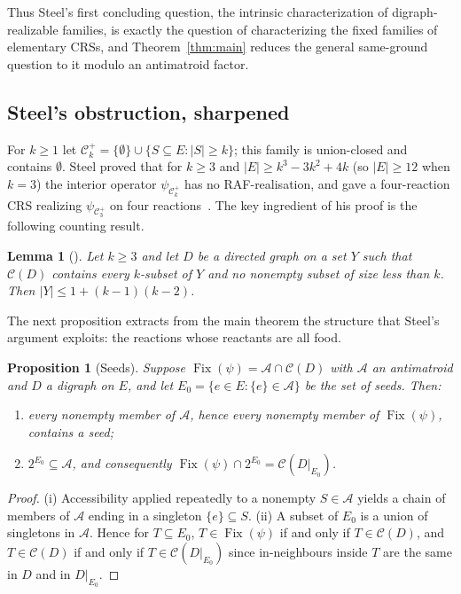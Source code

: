 \documentclass[11pt,a4paper]{article}
\theoremstyle{plain}
\newtheorem{proposition}[theorem]{Proposition}
\newtheorem{lemma}[theorem]{Lemma}
\theoremstyle{definition}
\theoremstyle{remark}
\newcommand{\Fix}{\operatorname{Fix}}
\newcommand{\cA}{\mathcal{A}}
\newcommand{\cC}{\mathcal{C}}
\newcommand{\pw}[1]{2^{#1}}
\newcommand{\Cplus}[1]{\cC^{+}_{#1}}
\begin{document}
Thus Steel's first concluding question, the intrinsic characterization of digraph-realizable families, is exactly the question of characterizing the fixed families of elementary CRSs, and Theorem~\ref{thm:main} reduces the general same-ground question to it modulo an antimatroid factor.

\subsection{Steel's obstruction, sharpened}\label{sec:steel-obstruction}

For $k\ge 1$ let $\Cplus{k}=\{\emptyset\}\cup\{S\subseteq E:|S|\ge k\}$; this family is union-closed and contains $\emptyset$. Steel proved that for $k\ge3$ and $|E|\ge k^3-3k^2+4k$ (so $|E|\ge 12$ when $k=3$) the interior operator $\psi_{\Cplus{k}}$ has no RAF-realisation, and gave a four-reaction CRS realizing $\psi_{\Cplus{3}}$ on four reactions~\cite[Proposition~5 and the subsequent remarks]{steel2023interior}. The key ingredient of his proof is the following counting result.

\begin{lemma}[{\cite[Proposition~2(iii)]{steel2023interior}}]\label{lem:steel-count}
Let $k\ge3$ and let $D$ be a directed graph on a set $Y$ such that $\cC(D)$ contains every $k$-subset of $Y$ and no nonempty subset of size less than $k$. Then $|Y|\le 1+(k-1)(k-2)$.
\end{lemma}

The next proposition extracts from the main theorem the structure that Steel's argument exploits: the reactions whose reactants are all food.

\begin{proposition}[Seeds]\label{prop:seeds}
Suppose $\Fix(\psi)=\cA\cap\cC(D)$ with $\cA$ an antimatroid and $D$ a digraph on $E$, and let $E_0=\{e\in E:\{e\}\in\cA\}$ be the set of \emph{seeds}. Then:
\begin{enumerate}[label=(\roman*)]
\item every nonempty member of $\cA$, hence every nonempty member of $\Fix(\psi)$, contains a seed;
\item $\pw{E_0}\subseteq\cA$, and consequently $\Fix(\psi)\cap\pw{E_0}=\cC(D|_{E_0})$.
\end{enumerate}
\end{proposition}

\begin{proof}
(i) Accessibility applied repeatedly to a nonempty $S\in\cA$ yields a chain of members of $\cA$ ending in a singleton $\{e\}\subseteq S$. (ii) A subset of $E_0$ is a union of singletons in $\cA$. Hence for $T\subseteq E_0$, $T\in\Fix(\psi)$ if and only if $T\in\cC(D)$, and $T\in\cC(D)$ if and only if $T\in\cC(D|_{E_0})$ since in-neighbours inside $T$ are the same in $D$ and in $D|_{E_0}$.
\end{proof}
\end{document}
